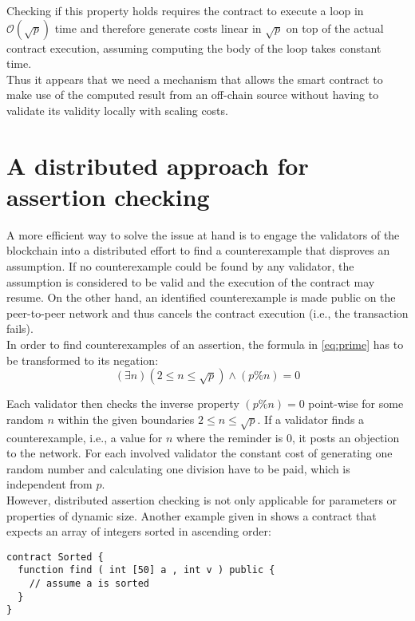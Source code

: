 Checking if this property holds requires the contract to execute a loop in $\mathcal{O}(\sqrt{p})$ time and therefore generate costs linear in $\sqrt{p}$ on top of the actual contract execution, assuming computing the body of the loop takes constant time.\\
Thus it appears that we need a mechanism that allows the smart contract to make use of the computed result from an off-chain source without having to validate its validity locally with scaling costs.

\section{A distributed approach for assertion checking}
A more efficient way to solve the issue at hand is to engage the validators of the blockchain into a distributed effort to find a counterexample that disproves an assumption. If no counterexample could be found by any validator, the assumption is considered to be valid and the execution of the contract may resume. On the other hand, an identified counterexample is made public on the peer-to-peer network and thus cancels the contract execution (i.e., the transaction fails). \\
In order to find counterexamples of an assertion, the formula in \ref{eq:prime} has to be transformed to its negation:
\begin{equation}\label{eq:prime_neg}
	(\exists n) (2 \le n \le \sqrt{p}) \wedge (p \% n) = 0
\end{equation}

Each validator then checks the inverse property $(p \% n) = 0$ point-wise for some random $n$ within the given boundaries $2 \le n \le \sqrt{p}$. If a validator finds a counterexample, i.e., a value for $n$ where the reminder is $0$, it posts an objection to the network. For each involved validator the constant cost of generating one random number and calculating one division have to be paid, which is independent from $p$. \\
However, distributed assertion checking is not only applicable for parameters or properties of dynamic size. Another example given in \cite{thiemann_2020} shows a contract that expects an array of integers sorted in ascending order: 

\begin{lstlisting}[caption=Smart Contract expecting a sorted array, numbers=none, language=Solidity, label=lst:sorted]
contract Sorted {
  function find ( int [50] a , int v ) public {
    // assume a is sorted
  }
}
\end{lstlisting}
 
